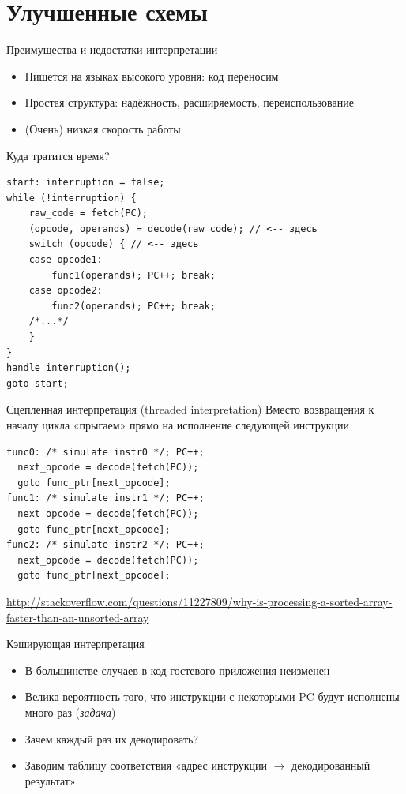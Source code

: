 \documentclass{beamer}
\begin{document}
\section{Улучшенные схемы}

\begin{frame}{Преимущества и недостатки интерпретации}
\begin{itemize}
\item Пишется на языках высокого уровня: код переносим
\item Простая структура: надёжность, расширяемость, переиспользование
\end{itemize}
\pause
\begin{itemize}
\item (Очень) низкая скорость работы
\end{itemize}
\end{frame}

\begin{frame}[fragile]{Куда тратится время?}
\begin{verbatim}
start: interruption = false;
while (!interruption) {
    raw_code = fetch(PC);
    (opcode, operands) = decode(raw_code); // <-- здесь
    switch (opcode) { // <-- здесь
    case opcode1:
        func1(operands); PC++; break;
    case opcode2:
        func2(operands); PC++; break;
    /*...*/
    }
}
handle_interruption();
goto start;
\end{verbatim}
\end{frame}

\begin{frame}[fragile]{Сцепленная интерпретация (threaded interpretation)}
Вместо возвращения к началу цикла «прыгаем» прямо на исполнение следующей инструкции
\begin{verbatim}
func0: /* simulate instr0 */; PC++;
  next_opcode = decode(fetch(PC));
  goto func_ptr[next_opcode];
func1: /* simulate instr1 */; PC++;
  next_opcode = decode(fetch(PC));
  goto func_ptr[next_opcode];
func2: /* simulate instr2 */; PC++;
  next_opcode = decode(fetch(PC));
  goto func_ptr[next_opcode];
\end{verbatim}

\tiny\url{http://stackoverflow.com/questions/11227809/why-is-processing-a-sorted-array-faster-than-an-unsorted-array}
\end{frame}

\begin{frame}{Кэширующая интерпретация}
\begin{itemize}
\item В большинстве случаев в код гостевого приложения неизменен
\item Велика вероятность того, что инструкции с некоторыми PC будут исполнены много раз (\textit{задача})
\item Зачем каждый раз их декодировать?
\item Заводим таблицу соответствия «адрес инструкции $\rightarrow$ декодированный результат» 
\end{itemize}

\end{frame}
\end{document}
